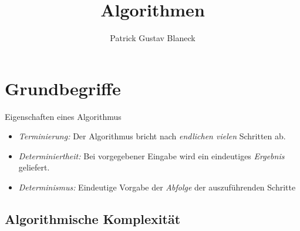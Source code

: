 \documentclass[german]{../spicker}
\title{Algorithmen}
\author{Patrick Gustav Blaneck}
\begin{document}
\maketitle
\tableofcontents
\newpage


\section{Grundbegriffe}
\begin{defi}{Eigenschaften eines Algorithmus}
    \begin{itemize}
        \item \emph{Terminierung:} Der Algorithmus bricht nach \emph{endlichen vielen} Schritten ab.
        \item \emph{Determiniertheit:} Bei vorgegebener Eingabe wird ein eindeutiges \emph{Ergebnis} geliefert.
        \item \emph{Determinismus:} Eindeutige Vorgabe der \emph{Abfolge} der auszuführenden Schritte
    \end{itemize}
\end{defi}

\subsection{Algorithmische Komplexität}
\end{document}
